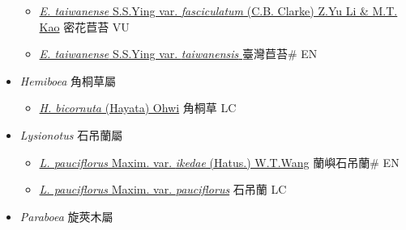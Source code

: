\begin{itemize}
  \begin{itemize}
        \item[] \href{http://www.theplantlist.org/tpl1.1/search?q=Epithema+taiwanense+var.+fasciculatum}{\textit{E. taiwanense} S.S.Ying var. \textit{fasciculatum} (C.B. Clarke) Z.Yu Li \& M.T. Kao}     密花苣苔 VU
        \item[] \href{http://www.theplantlist.org/tpl1.1/search?q=Epithema+taiwanense+var.+taiwanensis}{\textit{E. taiwanense} S.S.Ying var. \textit{taiwanensis} }     臺灣苣苔\# EN
  \end{itemize}
 \item[] \textit{Hemiboea} 角桐草屬
                    
  \begin{itemize}
        \item[] \href{http://www.theplantlist.org/tpl1.1/search?q=Hemiboea+bicornuta}{\textit{H. bicornuta} (Hayata) Ohwi}   角桐草 LC
  \end{itemize}
 \item[] \textit{Lysionotus} 石吊蘭屬
                    
  \begin{itemize}
        \item[] \href{http://www.theplantlist.org/tpl1.1/search?q=Lysionotus+pauciflorus+var.+ikedae}{\textit{L. pauciflorus} Maxim. var. \textit{ikedae} (Hatus.) W.T.Wang}   蘭嶼石吊蘭\# EN
        \item[] \href{http://www.theplantlist.org/tpl1.1/search?q=Lysionotus+pauciflorus+var.+pauciflorus}{\textit{L. pauciflorus} Maxim. var. \textit{pauciflorus}}   石吊蘭 LC
  \end{itemize}
 \item[] \textit{Paraboea} 旋莢木屬
                    

\end{itemize}
